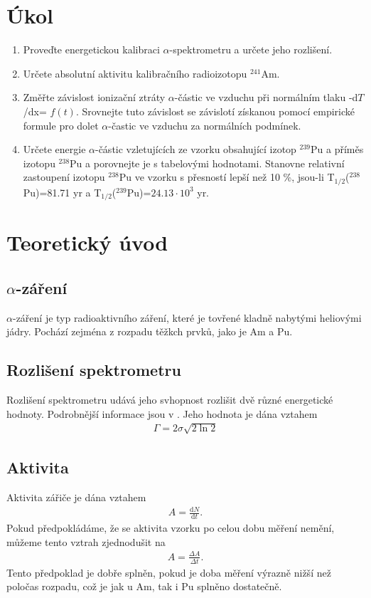 \documentclass[a4paper,12pt]{article}
\renewcommand{\d}{\mbox{d}}
\begin{document}
\section{Úkol}
\begin{enumerate}
    \item Proveďte energetickou kalibraci $\alpha$-spektrometru a určete jeho rozlišení.
    \item Určete absolutní aktivitu kalibračního radioizotopu $^{241}$Am.
    \item Změřte závislost ionizační ztráty $\alpha$-částic ve vzduchu při normálním 
    tlaku -d$T$/dx= $f(t)$. Srovnejte tuto závislost se závislotí získanou pomocí empirické formule 
    pro dolet $\alpha$-častic ve vzduchu za normálních podmínek.
    \item Určete energie $\alpha$-částic vzletujících ze vzorku obsahující izotop $^{239}$Pu a příměs 
    izotopu $^{238}$Pu a porovnejte je s tabelovými hodnotami. Stanovne relativní zastoupení izotopu 
    $^{238}$Pu ve vzorku s přesností lepší než 10 \%, jsou-li T$_{1/2}$($^{238}$Pu)=81.71 yr a 
    T$_{1/2}$($^{239}$Pu)=$24.13\cdot10^3$ yr.
\end{enumerate}

\section{Teoretický úvod}
\subsection{$\alpha$-záření}
$\alpha$-záření je typ radioaktivního záření, které je tovřené kladně nabytými heliovými jádry. 
Pochází zejména z rozpadu těžkch prvků, jako je Am a Pu.

\subsection{Rozlišení spektrometru}
Rozlišení spektrometru udává jeho svhopnost rozlišit dvě různé energetické hodnoty. 
Podrobnější informace jsou v \cite{text}. Jeho hodnota je dána vztahem
\begin{eqnarray}
\Gamma=2\sigma\sqrt{2\ln 2}
\label{gamma}
\end{eqnarray}

\subsection{Aktivita}
Aktivita zářiče je dána vztahem
\begin{eqnarray}
A=\frac{\d N}{\d t}.
\end{eqnarray}
Pokud předpokládáme, že se aktivita vzorku po celou dobu měření nemění, můžeme tento vztrah zjednodušit na
\begin{eqnarray}
A=\frac{\Delta A}{\Delta t}.
\end{eqnarray}
Tento předpoklad je dobře splněn, pokud je doba měření výrazně nižší než poločas rozpadu, což je jak u 
Am, tak i Pu splněno dostatečně.
\end{document}
